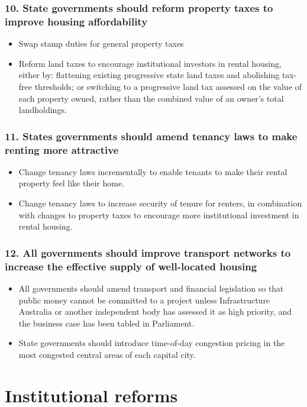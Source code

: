 \documentclass[FrontPage]{grattan}
\begin{document}
\subsubsection{10. State governments should reform property taxes to improve housing affordability}
\begin{itemize}
\item Swap stamp duties for general property taxes
\item Reform land taxes to encourage institutional investors in rental housing, either by: flattening existing progressive state land taxes and abolishing tax-free thresholds; or switching to a progressive land tax assessed on the value of each property owned, rather than the combined value of an owner's total landholdings.
\end{itemize}

\pagebreak
\subsubsection{11. States governments should amend tenancy laws to make renting more attractive}
\begin{itemize}
\item Change tenancy laws incrementally to enable tenants to make their rental property feel like their home.
\item Change tenancy laws to increase security of tenure for renters, in combination with changes to property taxes to encourage more institutional investment in rental housing.
\end{itemize}

\subsubsection{12. All governments should improve transport networks to increase the effective supply of well-located housing}
\begin{itemize}
\item All governments should amend transport and financial legislation so that public money cannot be committed to a project unless Infrastructure Australia or another independent body has assessed it as high priority, and the business case has been tabled in Parliament.
\item State governments should introduce time-of-day congestion pricing in the most congested central areas of each capital city.
\end{itemize}


\section*{Institutional reforms}
\end{document}
